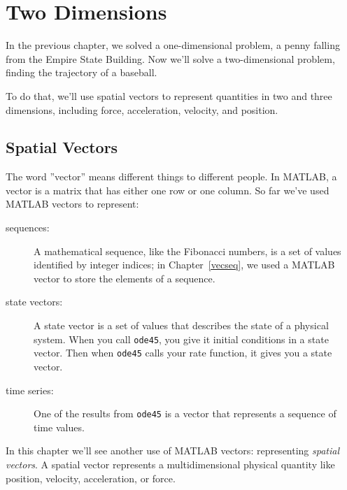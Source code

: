 \chapter{Two Dimensions}
\minitoc{}

In the previous chapter, we solved a one-dimensional problem, a penny falling from the Empire State Building.  Now we'll solve a two-dimensional problem, finding the trajectory of a baseball.


To do that, we'll use spatial vectors to represent quantities in two and three dimensions, including force, acceleration, velocity, and position.

\section{Spatial Vectors}
\label{spacial}

The word ''vector'' means different
things to different people.  In MATLAB, a vector is a matrix that has
either one row or one column.  So far we've used MATLAB vectors to
represent:

\begin{description}

\item[sequences:] A mathematical sequence, like the Fibonacci numbers, is a set of values identified by integer indices; in Chapter~\ref{vecseq}, we used a MATLAB vector to store the elements of a sequence. 

\item[state vectors:] A state vector is a set of values that
describes the state of a physical system.  When you call
{\tt ode45}, you give it initial conditions in a state
vector.  Then when {\tt ode45} calls your rate function, it
gives you a state vector.

\item[time series:] One of the results from {\tt ode45} is a vector that represents a sequence of time values.

\end{description}


In this chapter we'll see another use of MATLAB vectors: representing
\emph{spatial vectors}.  A spatial vector represents a multidimensional physical quantity like position, velocity, acceleration, or force.


